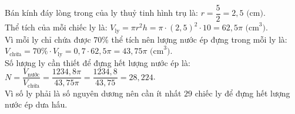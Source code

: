 \begin{bt}
{\begin{enumerate}[a)]
	Bán kính đáy lòng trong của ly thuỷ tinh hình trụ là: $r = \dfrac{5}{2} = 2{,}5\text{ (cm)}$.\\
	Thể tích của mỗi chiếc ly là:
	$V_{\text{ly}} = \pi r^2 h = \pi \cdot (2{,}5)^2 \cdot 10 = 62{,}5\pi\text{ (cm}^3\text{)}$.\\
	Vì mỗi ly chỉ chứa được $70\%$ thể tích nên lượng nước ép đựng trong mỗi ly là:
	$V_{\text{chứa}} = 70\% \cdot V_{\text{ly}} = 0{,}7 \cdot 62{,}5\pi = 43{,}75\pi\text{ (cm}^3\text{)}$.\\
	Số lượng ly cần thiết để đựng hết lượng nước ép là:
	$N = \dfrac{V_{\text{nước}}}{V_{\text{chứa}}} = \dfrac{1234{,}8\pi}{43{,}75\pi} = \dfrac{1234{,}8}{43{,}75} = 28{,}224$.\\
	Vì số ly phải là số nguyên dương nên cần ít nhất $29$ chiếc ly để đựng hết lượng nước ép dưa hấu.
\end{enumerate}
}
\end{bt}

